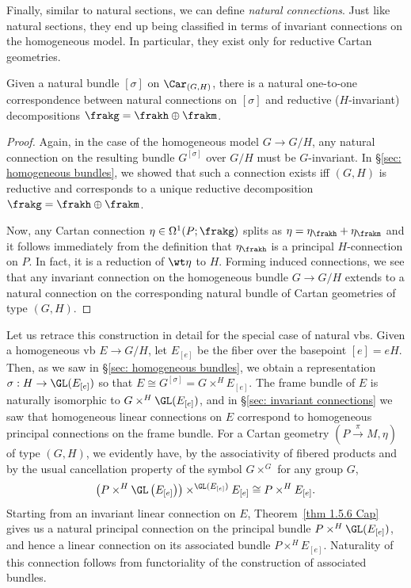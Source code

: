 Finally, similar to natural sections, we can define \emph{natural connections}. Just like natural sections, they end up being classified in terms of invariant connections on the homogeneous model. In particular, they exist only for reductive Cartan geometries.

\begin{prop}
    Given a natural bundle $[\sigma]$ on $\Car_{(G,H)}$, there is a natural one-to-one correspondence between natural connections on $[\sigma]$ and reductive ($H$-invariant) decompositions $\frakg=\frakh\oplus\frakm$.
\end{prop}
\begin{proof}
    Again, in the case of the homogeneous model $G\to G\slash H$, any natural connection on the resulting bundle $G^{[\sigma]}$ over $G\slash H$ must be $G$-invariant. 
    In \S\ref{sec: homogeneous bundles}, we showed that such a connection exists iff $(G,H)$ is reductive and corresponds to a unique reductive decomposition $\frakg=\frakh\oplus\frakm$.  
    
    Now, any Cartan connection $\eta\in\Omega^1(P;\frakg)$ splits as $\eta=\eta_\frakh+\eta_\frakm$ and it follows immediately from the definition that $\eta_\frakh$ is a principal $H$-connection on $P$. In fact, it is a reduction of $\wt\eta$ to $H$. Forming induced connections, we see that any invariant connection on the homogeneous bundle $G\to G\slash H$ extends to a natural connection on the corresponding natural bundle of Cartan geometries of type $(G,H)$.
\end{proof}


Let us retrace this construction in detail for the special case of natural \glspl{vb}. Given a homogeneous \gls{vb} $E\to G\slash H$, let $E_{[e]}$ be the fiber over the basepoint $[e]=eH$. Then, as we saw in \S\ref{sec: homogeneous bundles}, we obtain a representation $\sigma:H\to \GL(E_{[e]})$ so that $E\cong G^{[\sigma]}=G\times^H E_{[e]}$. The frame bundle of $E$ is naturally isomorphic to $G\times^H \GL(E_{[e]})$, and in \S\ref{sec: invariant connections} we saw that homogeneous linear connections on $E$ correspond to homogeneous principal connections on the frame bundle.  For a Cartan geometry $(P\overset{\pi}{\to} M,\eta)$ of type $(G,H)$, we evidently have, by the associativity of fibered products and by the usual cancellation property of the symbol $G\times^G $ for any group $G$,
\[\left(P\times^H\GL\left(E_{[e]}\right)\right)\times^{\GL(E_{[e]})}E_{[e]}\cong P\times^H E_{[e]}.\]
Starting from an invariant linear connection on $E$, Theorem~\ref{thm 1.5.6 Cap} gives us a natural principal connection on the principal bundle $P\times^H \GL(E_{[e]})$, and hence a linear connection on its associated bundle $P\times^H E_{[e]}$. Naturality of this connection follows from functoriality of the construction of associated bundles.







